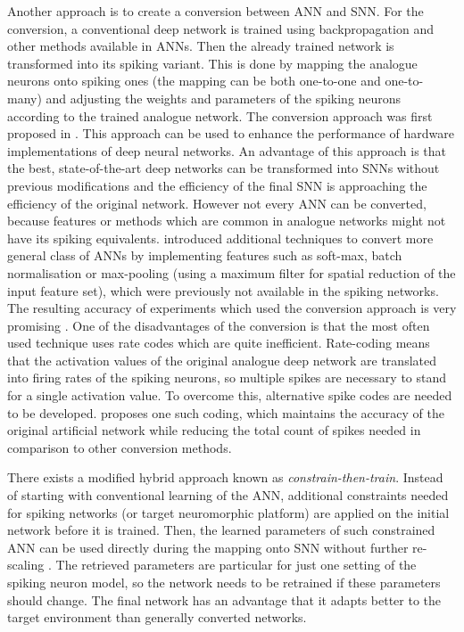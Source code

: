 Another approach is to create a conversion between ANN and SNN. For the conversion, a conventional deep network is trained using backpropagation and other methods available in ANNs. Then the already trained network is transformed into its spiking variant. This is done by mapping the analogue neurons onto spiking ones (the mapping can be both one-to-one and one-to-many) and adjusting the weights and parameters of the spiking neurons according to the trained analogue network. The conversion approach was first proposed in \cite{perez-carrascoMappingFrameDriven13}. This approach can be used to enhance the performance of hardware implementations of deep neural networks. An advantage of this approach is that the best, state-of-the-art deep networks can be transformed into SNNs without previous modifications and the efficiency of the final SNN is approaching the efficiency of the original network. However not every ANN can be converted, because features or methods which are common in analogue networks might not have its spiking equivalents. \cite{rueckauerConversionContinuousValuedDeep2017} introduced additional techniques to convert more general class of ANNs by implementing features such as soft-max, batch normalisation or max-pooling (using a maximum filter for spatial reduction of the input feature set), which were previously not available in the spiking networks. The resulting accuracy of experiments which used the conversion approach is very promising \cite{tavanaeiDeepLearningSpiking2019, pfeifferDeepLearningSpiking2018}. One of the disadvantages of the conversion is that the most often used technique uses rate codes which are quite inefficient. Rate-coding means that the activation values of the original analogue deep network are translated into firing rates of the spiking neurons, so multiple spikes are necessary to stand for a single activation value. To overcome this, alternative spike codes are needed to be developed. \cite{zambranoFastEfficientAsynchronous2016} proposes one such coding, which maintains the accuracy of the original artificial network while reducing the total count of spikes needed in comparison to other conversion methods. \par
There exists a modified hybrid approach known as \textit{constrain-then-train}. Instead of starting with conventional learning of the ANN, additional constraints needed for spiking networks (or target neuromorphic platform) are applied on the initial network before it is trained. Then, the learned parameters of such constrained ANN can be used directly during the mapping onto SNN without further re-scaling \cite{pfeifferDeepLearningSpiking2018}. The retrieved parameters are particular for just one setting of the spiking neuron model, so the network needs to be retrained if these parameters should change. The final network has an advantage that it adapts better to the target environment than generally converted networks. \par
